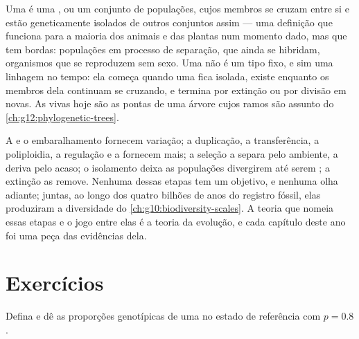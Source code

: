 \begin{proposition}\label{prop:g12:selection-drift-speciation:concept}
Uma  é uma , ou um conjunto de populações, cujos
membros se cruzam entre si e estão geneticamente isolados de outros
conjuntos assim --- uma definição que funciona para a maioria dos
animais e das plantas num momento dado, mas que tem bordas: populações
em processo de separação,  que ainda se hibridam, organismos
que se reproduzem sem sexo. Uma  não é um tipo fixo, e sim uma
linhagem no tempo: ela começa quando uma  fica isolada, existe
enquanto os membros dela continuam se cruzando, e termina por extinção
ou por divisão em  novas. As  vivas hoje são as pontas
de uma árvore cujos ramos são assunto do \cref{ch:g12:phylogenetic-trees}.
\end{proposition}
\admitted

\begin{remark}\label{rem:g12:selection-drift-speciation:assembled}
A  e o embaralhamento fornecem variação; a duplicação, a
transferência, a poliploidia, a regulação e a  fornecem mais; a
seleção a separa pelo ambiente, a deriva pelo acaso; o isolamento deixa
as populações divergirem até serem ; a extinção as remove.
Nenhuma dessas etapas tem um objetivo, e nenhuma olha adiante; juntas,
ao longo dos quatro bilhões de anos do registro fóssil, elas produziram
a diversidade do \cref{ch:g10:biodiversity-scales}. A teoria que nomeia
essas etapas e o jogo entre elas é a teoria da evolução, e cada
capítulo deste ano foi uma peça das evidências dela.
\end{remark}

\section{Exercícios}

\begin{exercise}[$\star$]\label{exo:g12:selection-drift-speciation:1}
Defina  e dê as proporções genotípicas de uma
 no estado de referência com $p = 0.8$.
\end{exercise}

